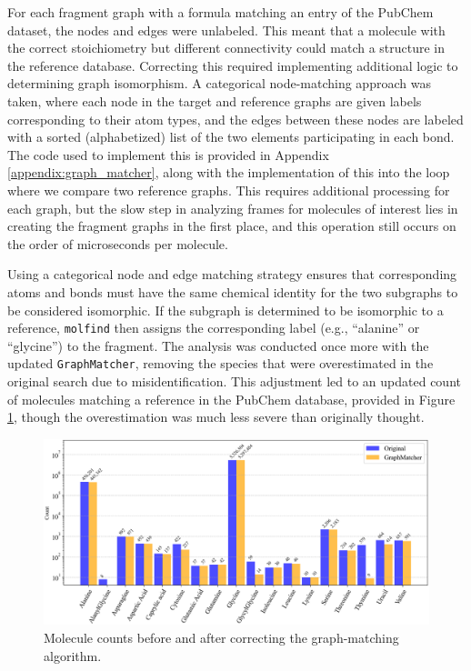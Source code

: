For each fragment graph with a formula matching an entry of the PubChem dataset, the nodes and edges were unlabeled.
This meant that a molecule with the correct stoichiometry but different connectivity could match a structure in the reference database.
Correcting this required implementing additional logic to determining graph isomorphism.
A categorical node-matching approach was taken, where each node in the target and reference graphs are given labels corresponding to their atom types, and the edges between these nodes are labeled with a sorted (alphabetized) list of the two elements participating in each bond.
The code used to implement this is provided in Appendix \ref{appendix:graph_matcher}, along with the implementation of this into the loop where we compare two reference graphs.
This requires additional processing for each graph, but the slow step in analyzing frames for molecules of interest lies in creating the fragment graphs in the first place, and this operation still occurs on the order of microseconds per molecule. 

Using a categorical node and edge matching strategy ensures that corresponding atoms and bonds must have the same chemical identity for the two subgraphs to be considered isomorphic. 
If the subgraph is determined to be isomorphic to a reference, \verb|molfind| then assigns the corresponding label (e.g., “alanine” or “glycine”) to the fragment. 
The analysis was conducted once more with the updated \verb|GraphMatcher|, removing the species that were overestimated in the original search due to misidentification. 
This adjustment led to an updated count of molecules matching a reference in the PubChem database, provided in Figure \ref{fig:graph_matching}, though the overestimation was much less severe than originally thought.

\begin{figure}[!h]
    \centering
    \includegraphics[width=1\linewidth]{Images/early_earth/updated_graphmatcher.png}
    \caption[Molecules identified incorrectly in the initial search]{Molecule counts before and after correcting the graph-matching algorithm.}
    \label{fig:graph_matching}
\end{figure}

